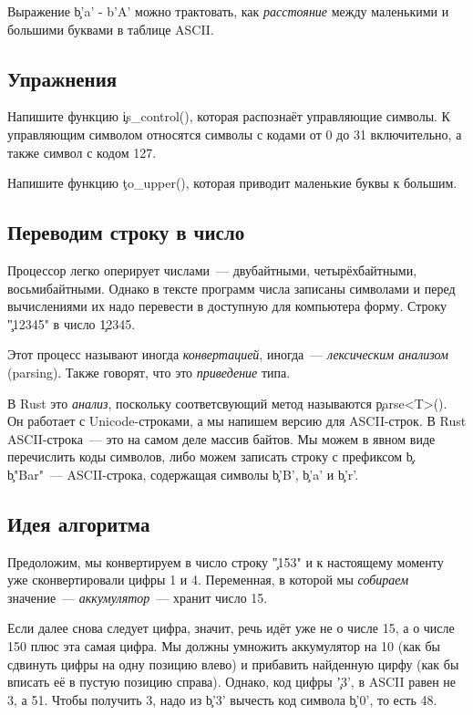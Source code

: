 Выражение \c{b'a' - b'A'} можно трактовать, как {\em расстояние} между маленькими и большими буквами в таблице ASCII.

\subsection{Упражнения}

\begin{Exercise}
  \Question
  Напишите функцию \c{is\_control()}, которая распознаёт управляющие символы.
  К управляющим символом относятся символы с кодами от 0 до 31 включительно, а также символ с кодом 127.
\end{Exercise}
  
\begin{Exercise}
  \Question
  Напишите функцию \c{to\_upper()}, которая приводит маленькие буквы к большим.
\end{Exercise}

\subsection{Переводим строку в число}

Процессор легко оперирует числами~--- двубайтными, четырёхбайтными, восьмибайтными.
Однако в тексте программ числа записаны символами и перед вычислениями их надо перевести в доступную для компьютера форму.
Строку \c{"12345"} в число \c{12345}.

Этот процесс называют иногда {\em конвертацией}, иногда~--- {\em лексическим анализом} (parsing).
Также говорят, что это {\em приведение} типа.

В Rust это {\em анализ}, поскольку соответсвующий метод называются \c{parse<T>()}.
Он работает с Unicode-строками, а мы напишем версию для ASCII-строк.
В Rust ASCII-строка~--- это на самом деле массив байтов.
Мы можем в явном виде перечислить коды символов, либо можем записать строку с префиксом \c{b}.
\c{b"Bar"}~--- ASCII-строка, содержащая символы \c{b'B'}, \c{b'a'} и \c{b'r'}.

\subsection{Идея алгоритма}

Предоложим, мы конвертируем в число строку \c{"153"} и к настоящему моменту уже сконвертировали цифры 1 и 4.
Переменная, в которой мы {\em собираем} значение~--- {\em аккумулятор}~--- хранит число 15.

Если далее снова следует цифра, значит, речь идёт уже не о числе 15, а о числе 150 плюс эта самая цифра.
Мы должны умножить аккумулятор на 10 (как бы сдвинуть цифры на одну позицию влево) и прибавить найденную цирфу (как бы вписать её в пустую позицию справа).
Однако, код цифры \c{'3'}, в ASCII равен не 3, а 51. Чтобы получить 3, надо из \c{b'3'} вычесть код символа \c{b'0'}, то есть 48.

